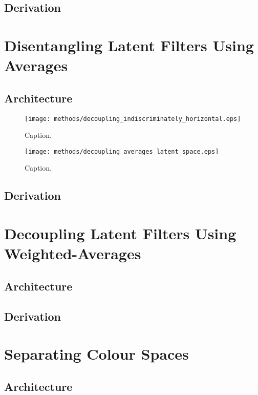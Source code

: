 \subsection{Derivation}



%
%
%
%
%
\section{Disentangling Latent Filters Using Averages}
\lipsum[2]
\subsection{Architecture}
\begin{figure}[H]
\centering
\captionsetup{justification=centering}
\texttt{[image: methods/decoupling\_indiscriminately\_horizontal.eps]}
\caption{Caption.}
\label{fig:decoupling_indiscriminately_horizontal}
\end{figure}

\begin{figure}[H]
\centering
\captionsetup{justification=centering}
\texttt{[image: methods/decoupling\_averages\_latent\_space.eps]}
\caption{Caption.}
\label{fig:decoupling_averages_latent_space}
\end{figure}

\subsection{Derivation}

%
%
%
%
%
\section{Decoupling Latent Filters Using Weighted-Averages}
\lipsum[2]
\subsection{Architecture}
\subsection{Derivation}

%
%
%
%
%
\section{Separating Colour Spaces}
\lipsum[2]
\subsection{Architecture}
